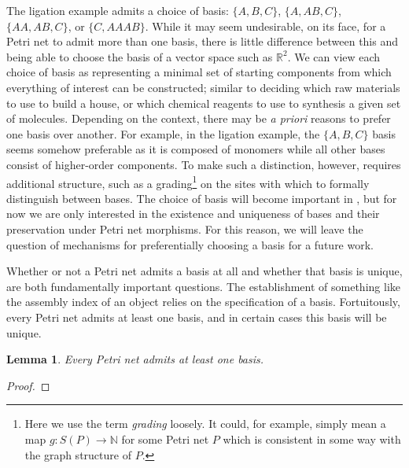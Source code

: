 \documentclass[aps,prd,onecolumn,nofootinbib,letterpaper,preprintnumbers,superscriptaddress,eqsecnum]{revtex4}
\newtheorem{lemma}{Lemma}
\theoremstyle{definition}
\newcommand{\N}{\mathbb{N}}
\newcommand{\R}{\mathbb{R}}
\newcommand{\red}[1]{{\color{red}#1}}
\newcommand{\TODO}[1]{\noindent\red{\textbf{TODO:}~#1}}
\begin{document}
The ligation example admits a choice of basis: $\{A,B,C\}$, $\{A,AB,C\}$, $\{AA,AB,C\}$, or $\{C,AAAB\}$.
While it may seem undesirable, on its face, for a Petri net to admit more than one basis, there is little difference between this and being able to choose the basis of a vector space such as $\R^2$.
We can view each choice of basis as representing a minimal set of starting components from which everything of interest can be constructed; similar to deciding which raw materials to use to build a house, or which chemical reagents to use to synthesis a given set of molecules.
Depending on the context, there may be \textit{a priori} reasons to prefer one basis over another.
For example, in the ligation example, the $\{A,B,C\}$ basis seems somehow preferable as it is composed of monomers while all other bases consist of higher-order components.
To make such a distinction, however, requires additional structure, such as a grading\footnote{Here we use the term \textit{grading} loosely. It could, for example, simply mean a map $g : S(P) \rightarrow \N$ for some Petri net $P$ which is consistent in some way with the graph structure of $P$.} on the sites with which to formally distinguish between bases.
The choice of basis will become important in , but for now we are only interested in the existence and uniqueness of bases and their preservation under Petri net morphisms.
For this reason, we will leave the question of mechanisms for preferentially choosing a basis for a future work.

Whether or not a Petri net admits a basis at all and whether that basis is unique, are both fundamentally important questions.
The establishment of something like the assembly index of an object relies on the specification of a basis.
Fortuitously, every Petri net admits at least one basis, and in certain cases this basis will be unique.
\begin{lemma}\label{lem:bases-exist}
    Every Petri net admits at least one basis.
\end{lemma}
\begin{proof}
    \TODO{Complete (likely to use Zorn's lemma)}
\end{proof}
\end{document}
